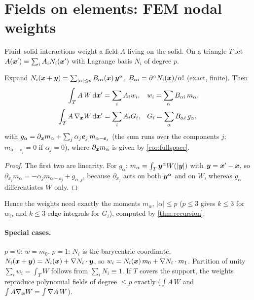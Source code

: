 \section{Fields on elements: FEM nodal weights}\label{sec:fem}

Fluid--solid interactions weight a field $A$ living on the solid. On a triangle $T$ let
$A(\bm x')=\sum_iA_iN_i(\bm x')$ with Lagrange basis $N_i$ of degree $p$.

\begin{proposition}\label{prop:fem}
Expand $N_i(\bm x+\bm y)=\sum_{|\alpha|\le p}B_{\alpha i}(\bm x)\,\bm y^\alpha$, $B_{\alpha i}=\partial^\alpha N_i(\bm x)/\alpha!$ (exact, finite). Then
\begin{align}
 \int_TA\,W\,\mathrm{d}\bm x'&=\sum_iA_iw_i,&& w_i=\sum_\alpha B_{\alpha i}\,m_\alpha,\\
 \int_TA\,\nabla_{\bm x} W\,\mathrm{d}\bm x'&=\sum_iA_iG_i,&& G_i=\sum_\alpha B_{\alpha i}\,g_\alpha,
\end{align}
with $g_{\alpha}=\partial_{\bm x} m_\alpha+\sum_j\alpha_j\bm e_j\,m_{\alpha-\bm e_j}$ (the sum runs over the components $j$; $m_{\alpha-\ee_j}=0$ if $\alpha_j=0$), where $\partial_{\bm x} m_\alpha$ is
given by \cref{cor:fullspace}.
\end{proposition}
\begin{proof}
The first two are linearity. For $g_\alpha$: $m_\alpha=\int_T\bm y^\alpha W(|\bm y|)$ with $\bm y=\bm x'-\bm x$, so
$\partial_{x_j}m_\alpha=-\alpha_jm_{\alpha-\ee_j}+g_{\alpha,j}$, because $\partial_{x_j}$ acts on both $\bm y^\alpha$ and on $W$,
whereas $g_\alpha$ differentiates $W$ only.
\end{proof}
Hence the weights need exactly the moments $m_\alpha$, $|\alpha|\le p$ ($p\le3$ gives $k\le3$ for $w_i$, and $k\le3$ edge
integrals for $G_i$), computed by \cref{thm:recursion}. 

\paragraph{Special cases.} $p=0$: $w=m_0$. $p=1$: $N_i$ is the barycentric coordinate, $N_i(\bm x+\bm y)=N_i(\bm x)+\nabla N_i\cdot\bm y$, so $w_i=N_i(\bm x)\,m_0+\nabla N_i\cdot m_1$.
Partition of unity $\sum_iw_i=\int_TW$ follows from $\sum_iN_i\equiv1$. If $T$ covers the support, the
weights reproduce polynomial fields of degree $\le p$ exactly ($\int A\,W$ and $\int A\nabla_{\bm x} W=\int\nabla A\,W$). 


